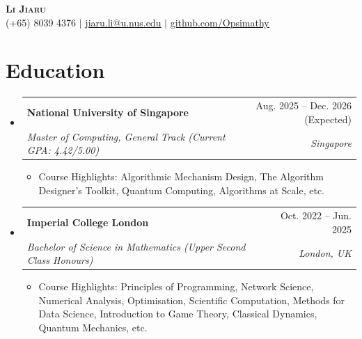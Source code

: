 \documentclass[letterpaper,11pt]{article}
\makeatletter
\newcommand{\resumeItem}[1]{
  \item\small{
    {#1 \vspace{-2pt}}
  }
}
\newcommand{\resumeSubheading}[4]{
  \vspace{-2pt}\item
    \begin{tabular*}{0.97\textwidth}[t]{l@{\extracolsep{\fill}}r}
      \textbf{#1} & #2 \\
      \textit{\small#3} & \textit{\small #4} \\
    \end{tabular*}\vspace{-7pt}
}
\newcommand{\resumeSubHeadingListStart}{\begin{itemize}[leftmargin=0.15in, label={}]}
\newcommand{\resumeSubHeadingListEnd}{\end{itemize}}
\newcommand{\resumeItemListStart}{\begin{itemize}}
\newcommand{\resumeItemListEnd}{\end{itemize}\vspace{-5pt}}
\makeatother
\begin{document}
\begin{center}
    \textbf{\Huge \scshape Li Jiaru} \\
    \small (+65) 8039 4376 $|$ \href{mailto:jiaru.li@u.nus.edu}{\underline{jiaru.li@u.nus.edu}} $|$ 
    \href{https://github.com/Opsimathy}{\underline{github.com/Opsimathy}}
\end{center}
\section{Education}
  \resumeSubHeadingListStart
    \resumeSubheading
      {National University of Singapore}{Aug. 2025 -- Dec. 2026 (Expected)}
      {Master of Computing, General Track (Current GPA: 4.42/5.00)}{Singapore}
      \resumeItemListStart
        \resumeItem{Course Highlights: Algorithmic Mechanism Design, The Algorithm Designer's Toolkit, Quantum Computing, Algorithms at Scale, etc.}
      \resumeItemListEnd
    \resumeSubheading
      {Imperial College London}{Oct. 2022 -- Jun. 2025}
      {Bachelor of Science in Mathematics (Upper Second Class Honours)}{London, UK}
      \resumeItemListStart
        \resumeItem{Course Highlights: Principles of Programming, Network Science, Numerical Analysis, Optimisation, Scientific Computation, Methods for Data Science, Introduction to Game Theory, Classical Dynamics, Quantum Mechanics, etc.}
      \resumeItemListEnd
  \resumeSubHeadingListEnd
\end{document}

